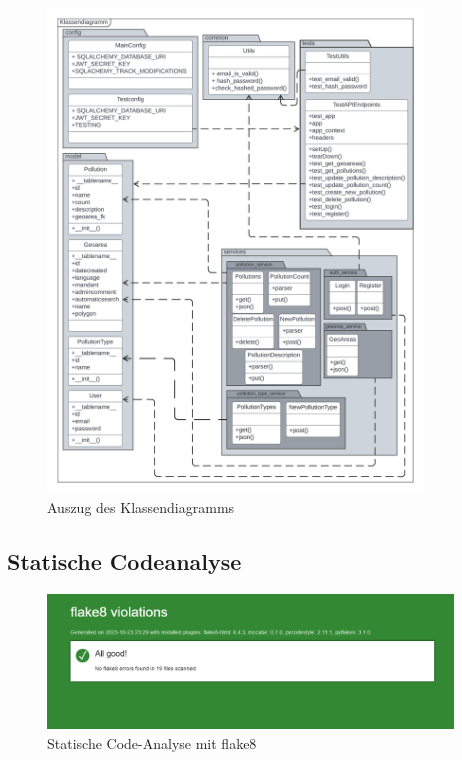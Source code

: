 \documentclass[a4paper,12pt]{article}
\begin{document}
\begin{figure}[h]
\centering
\includegraphics[width=0.89\textwidth]{bilder/klassendiagramm.png}
\caption{Auszug des Klassendiagramms}
\end{figure}

\clearpage
\subsection{Statische Codeanalyse}
\label{sec:codeanalyse}

\begin{figure}[h]
\centering
\includegraphics[width=0.96\textwidth]{bilder/flake8.png}
\caption{Statische Code-Analyse mit flake8}
\end{figure}
\end{document}

